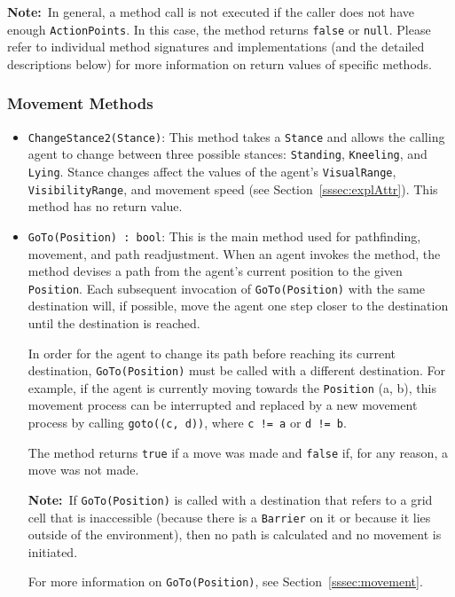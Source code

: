 \documentclass[a4paper,english,DIV=16,11pt,parskip=half,dvipsnames,listof=totoc,index=totoc,bibliography=totoc]{scrartcl}
\begin{document}
\faLightbulbO\: \textbf{Note:}~In general, a method call is not executed if the caller does not have enough \texttt{ActionPoints}. In this case, the method returns \texttt{false} or \texttt{null}. Please refer to individual method signatures and implementations (and the detailed descriptions below) for more information on return values of specific methods.
%
\subsubsection{Movement Methods} \label{sssec:movMeth}
\begin{itemize}
  \item \texttt{ChangeStance2(Stance)}: This method takes a \texttt{Stance} and allows the calling agent to change between three possible stances: \texttt{Standing}, \texttt{Kneeling}, and \texttt{Lying}. Stance changes affect the values of the agent's \texttt{VisualRange}, \texttt{VisibilityRange}, and movement speed (see Section~\ref{sssec:explAttr}). This method has no return value.
  \item \texttt{GoTo(Position) :~bool}: This is the main method used for pathfinding, movement, and path readjustment. When an agent invokes the method, the method devises a path from the agent's current position to the given \texttt{Position}. Each subsequent invocation of \texttt{GoTo(Position)} with the same destination will, if possible, move the agent one step closer to the destination until the destination is reached.
  
  In order for the agent to change its path before reaching its current destination, \texttt{GoTo(Position)} must be called with a different destination. For example, if the agent is currently moving towards the \texttt{Position} (a, b), this movement process can be interrupted and replaced by a new movement process by calling \texttt{goto((c, d))}, where \texttt{c != a} or \texttt{d != b}.
  
  The method returns \texttt{true} if a move was made and \texttt{false} if, for any reason, a move was not made.
  
  \faLightbulbO\: \textbf{Note:}~If \texttt{GoTo(Position)} is called with a destination that refers to a grid cell that is inaccessible (because there is a \texttt{Barrier} on it or because it lies outside of the environment), then no path is calculated and no movement is initiated.
  
  For more information on \texttt{GoTo(Position)}, see Section~\ref{sssec:movement}.
\end{itemize}
%
\end{document}
